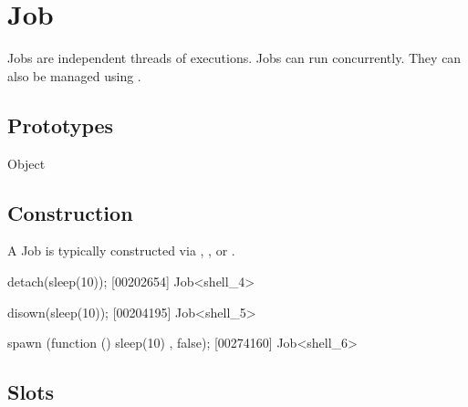 
\section{Job}

Jobs are independent threads of executions.  Jobs can run concurrently.
They can also be managed using .

\subsection{Prototypes}

\begin{refObjects}
\item[Object]
\end{refObjects}

\subsection{Construction}

A Job is typically constructed via ,
, or .

\begin{urbiscript}
detach(sleep(10));
[00202654] Job<shell_4>

disown(sleep(10));
[00204195] Job<shell_5>

spawn (function () { sleep(10) }, false);
[00274160] Job<shell_6>
\end{urbiscript}

\subsection{Slots}

